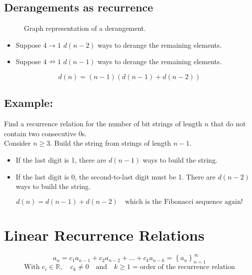 \documentclass[11pt]{article}
\begin{document}
\subsection{Derangements as recurrence}
\begin{figure}[!h]
    \centering
    \label{fig:graph}
    \caption{Graph representation of a derangement.}
\end{figure}
\begin{itemize}
    \item Suppose $4 \rightarrow 1$ \quad $d(n-2)$ ways to derange the remaining elements.
    \item Suppose $4 \nrightarrow 1$ \quad $d(n-1)$ ways to derange the remaining elements.
\end{itemize}
\[
d(n) = (n-1)(d(n-1) + d(n-2))
\]

\subsection*{Example:}
Find a recurrence relation for the number of bit strings of length $n$ that do not contain two consecutive 0s. \\
Consider $n \geq 3$. Build the string from strings of length $n-1$.
\begin{itemize}
    \item If the last digit is 1, there are $d(n-1)$ ways to build the string.
    \item If the last digit is 0, the second-to-last digit must be 1. There are $d(n-2)$ ways to build the string.
\end{itemize}
\[
d(n) = d(n-1) + d(n-2) \quad \text{which is the Fibonacci sequence again!}
\]

\section{Linear Recurrence Relations}
\[
a_n = c_1 a_{n-1} + c_2 a_{n-2} + \dots + c_k a_{n-k} = \left\{a_n\right\}_{n=1}^{\infty}
\]
\[
\text{With } c_i \in \mathbb{R}, \quad c_k \neq 0 \quad \text{and} \quad k \geq 1 = \text{order of the recurrence relation}
\]
\end{document}
